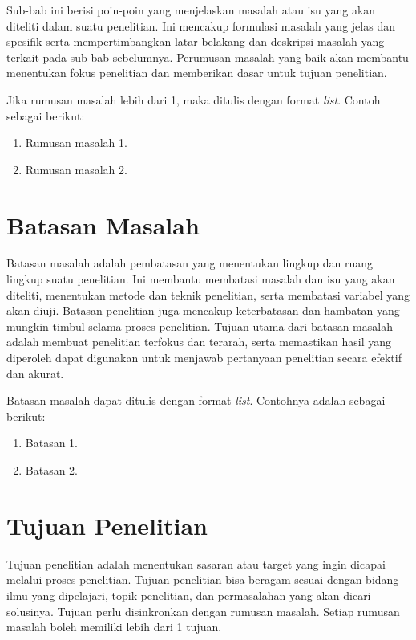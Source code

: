 Sub-bab ini berisi poin-poin yang menjelaskan masalah atau isu yang akan diteliti dalam suatu penelitian. Ini mencakup formulasi masalah yang jelas dan spesifik serta mempertimbangkan latar belakang dan deskripsi masalah yang terkait pada sub-bab sebelumnya. Perumusan masalah yang baik akan membantu menentukan fokus penelitian dan memberikan dasar untuk tujuan penelitian.

Jika rumusan masalah lebih dari 1, maka ditulis dengan format \textit{list}. Contoh sebagai berikut:

\begin{enumerate}
	\item Rumusan masalah 1.
	\item Rumusan masalah 2.
\end{enumerate}

\section{Batasan Masalah}

Batasan masalah adalah pembatasan yang menentukan lingkup dan ruang lingkup suatu penelitian. Ini membantu membatasi masalah dan isu yang akan diteliti, menentukan metode dan teknik penelitian, serta membatasi variabel yang akan diuji. Batasan penelitian juga mencakup keterbatasan dan hambatan yang mungkin timbul selama proses penelitian. Tujuan utama dari batasan masalah adalah membuat penelitian terfokus dan terarah, serta memastikan hasil yang diperoleh dapat digunakan untuk menjawab pertanyaan penelitian secara efektif dan akurat.

Batasan masalah dapat ditulis dengan format \textit{list}. Contohnya adalah sebagai berikut:

\begin{enumerate}
	\item Batasan 1.
	\item Batasan 2.
\end{enumerate}

\section{Tujuan Penelitian}

Tujuan penelitian adalah menentukan sasaran atau target yang ingin dicapai melalui proses penelitian. Tujuan penelitian bisa beragam sesuai dengan bidang ilmu yang dipelajari, topik penelitian, dan permasalahan yang akan dicari solusinya. Tujuan perlu disinkronkan dengan rumusan masalah. Setiap rumusan masalah boleh memiliki lebih dari 1 tujuan.

